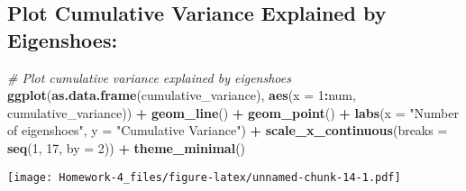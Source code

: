 \documentclass[
]{article}
\newenvironment{Shaded}{\begin{snugshade}}{\end{snugshade}}
\newcommand{\AttributeTok}[1]{\textcolor[rgb]{0.13,0.29,0.53}{#1}}
\newcommand{\CommentTok}[1]{\textcolor[rgb]{0.56,0.35,0.01}{\textit{#1}}}
\newcommand{\DecValTok}[1]{\textcolor[rgb]{0.00,0.00,0.81}{#1}}
\newcommand{\FunctionTok}[1]{\textcolor[rgb]{0.13,0.29,0.53}{\textbf{#1}}}
\newcommand{\NormalTok}[1]{#1}
\newcommand{\SpecialCharTok}[1]{\textcolor[rgb]{0.81,0.36,0.00}{\textbf{#1}}}
\newcommand{\StringTok}[1]{\textcolor[rgb]{0.31,0.60,0.02}{#1}}
\begin{document}
\hypertarget{plot-cumulative-variance-explained-by-eigenshoes}{%
\subsection{Plot Cumulative Variance Explained by
Eigenshoes:}\label{plot-cumulative-variance-explained-by-eigenshoes}}

\begin{Shaded}
\begin{Highlighting}[]
\CommentTok{\# Plot cumulative variance explained by eigenshoes}
\FunctionTok{ggplot}\NormalTok{(}\FunctionTok{as.data.frame}\NormalTok{(cumulative\_variance), }\FunctionTok{aes}\NormalTok{(}\AttributeTok{x =} \DecValTok{1}\SpecialCharTok{:}\NormalTok{num, cumulative\_variance)) }\SpecialCharTok{+}
    \FunctionTok{geom\_line}\NormalTok{() }\SpecialCharTok{+} \FunctionTok{geom\_point}\NormalTok{() }\SpecialCharTok{+} \FunctionTok{labs}\NormalTok{(}\AttributeTok{x =} \StringTok{"Number of eigenshoes"}\NormalTok{, }\AttributeTok{y =} \StringTok{"Cumulative Variance"}\NormalTok{) }\SpecialCharTok{+}
    \FunctionTok{scale\_x\_continuous}\NormalTok{(}\AttributeTok{breaks =} \FunctionTok{seq}\NormalTok{(}\DecValTok{1}\NormalTok{, }\DecValTok{17}\NormalTok{, }\AttributeTok{by =} \DecValTok{2}\NormalTok{)) }\SpecialCharTok{+} \FunctionTok{theme\_minimal}\NormalTok{()}
\end{Highlighting}
\end{Shaded}

\texttt{[image: Homework-4\_files/figure-latex/unnamed-chunk-14-1.pdf]}
\end{document}
